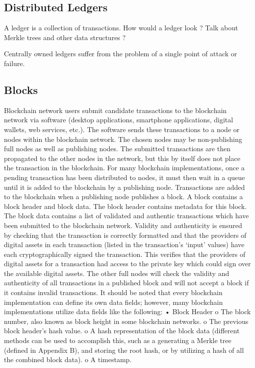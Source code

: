 \subsection{Distributed Ledgers}

A ledger is a collection of transactions.  How would a ledger look ?
Talk about Merkle trees and other data structures ?

Centrally owned ledgers suffer from the problem of a single point of attack or failure.

\subsection{Blocks}

Blockchain network users submit candidate transactions to the blockchain network via software
(desktop applications, smartphone applications, digital wallets, web services, etc.). The software
sends these transactions to a node or nodes within the blockchain network. The chosen nodes
may be non-publishing full nodes as well as publishing nodes. The submitted transactions are
then propagated to the other nodes in the network, but this by itself does not place the transaction
in the blockchain. For many blockchain implementations, once a pending transaction has been
distributed to nodes, it must then wait in a queue until it is added to the blockchain by a
publishing node.
Transactions are added to the blockchain when a publishing node publishes a block. A block
contains a block header and block data. The block header contains metadata for this block. The
block data contains a list of validated and authentic transactions which have been submitted to
the blockchain network. Validity and authenticity is ensured by checking that the transaction is
correctly formatted and that the providers of digital assets in each transaction (listed in the
transaction’s ‘input’ values) have each cryptographically signed the transaction. This verifies that
the providers of digital assets for a transaction had access to the private key which could sign
over the available digital assets. The other full nodes will check the validity and authenticity of
all transactions in a published block and will not accept a block if it contains invalid transactions.
It should be noted that every blockchain implementation can define its own data fields; however,
many blockchain implementations utilize data fields like the following:
• Block Header
o The block number, also known as block height in some blockchain networks.
o The previous block header’s hash value.
o A hash representation of the block data (different methods can be used to
accomplish this, such as a generating a Merkle tree (defined in Appendix B), and
storing the root hash, or by utilizing a hash of all the combined block data).
o A timestamp.


